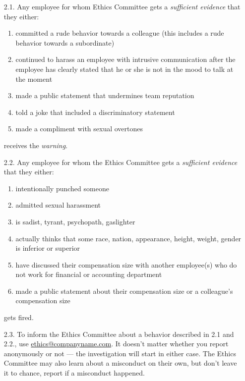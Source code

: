 \documentclass[11pt]{article}
\theoremstyle{remark}
\theoremstyle{definition}
\begin{document}
\begin{enumerate}

\item[2.1.] Any employee for whom Ethics Committee gets a \textit{sufficient evidence} that they either:
\begin{enumerate}

\item committed a rude behavior towards a colleague (this includes a rude behavior towards a subordinate)
\item continued to harass an employee with intrusive communication after the employee has clearly stated that he or she is not in the mood to talk at the moment
\item made a public statement that undermines team reputation
\item told a joke that included a discriminatory statement
\item made a compliment with sexual overtones 

\end{enumerate} receives the \textit{warning}. 





\item[2.2.] Any employee for whom the Ethics Committee gets a \textit{sufficient evidence} that they either:

\begin{enumerate}
\item intentionally punched someone
\item admitted sexual harassment
\item is sadist, tyrant, psychopath, gaslighter
\item actually thinks that some race, nation, appearance, height, weight, gender is inferior or superior
\item have discussed their compensation size with another employee(s) who do not work for financial or accounting department 
\item made a public statement about their compensation size or a colleague's compensation size

\end{enumerate} gets fired. 



\item[2.3.] To inform the Ethics Committee about a behavior described in 2.1 and 2.2., use \href{mailto:ethics@companyname.com}{ethics@companyname.com}. It doesn't matter whether you report anonymously or not --- the investigation will start in either case. The Ethics Committee may also learn about a misconduct on their own, but don't leave it to chance, report if a misconduct happened.




\end{enumerate}
\end{document}
